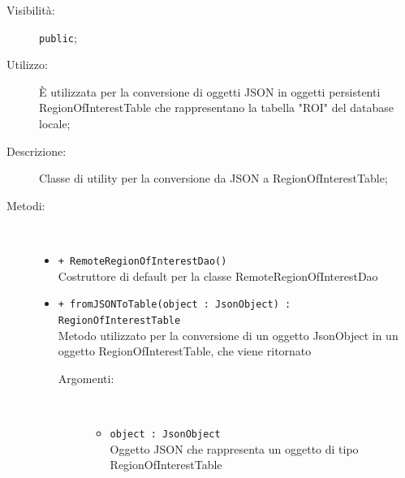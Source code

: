 \documentclass[../DefinizioneDiProdotto.tex]{subfiles}
\begin{document}
\begin{description}
\begin{itemize}
	\end{itemize}
	\item[Visibilità:] \texttt{public};
	\item[Utilizzo:] È utilizzata per la conversione di oggetti JSON in oggetti persistenti RegionOfInterestTable che rappresentano la tabella "ROI" del database locale;
	\item[Descrizione:] Classe di utility per la conversione da JSON a RegionOfInterestTable;
	\item[Metodi:] \
	\begin{itemize}
		\item \texttt{+ RemoteRegionOfInterestDao()}\\
		Costruttore di default per la classe RemoteRegionOfInterestDao
		\item \texttt{+ fromJSONToTable(object : JsonObject) : RegionOfInterestTable}\\
		Metodo utilizzato per la conversione di un oggetto JsonObject in un oggetto RegionOfInterestTable, che viene ritornato
		\begin{description}
			\item[Argomenti:] \
			\begin{itemize}
				\item \texttt{object : JsonObject}\\
				Oggetto JSON che rappresenta un oggetto di tipo RegionOfInterestTable\end{itemize}
		\end{description}
	\end{itemize}
\end{description}
\end{document}
